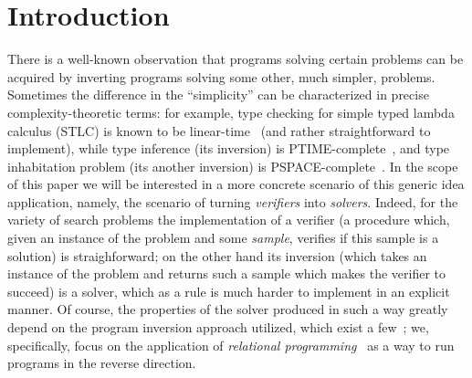 \section{Introduction}


There is a well-known observation\cite{relational_solvers_for_seach_problems,semantics_modifiers} that programs solving certain problems can
be acquired by inverting programs solving some other, much simpler, problems. Sometimes
the difference in the ``simplicity'' can be characterized in precise complexity-theoretic terms:
for example, type checking for simple typed lambda calculus (STLC) is known to be
linear-time~\cite{find_one} (and rather straightforward to implement), while type inference (its inversion)
is PTIME-complete~\cite{find_one}, and type inhabitation problem (its another inversion) is
PSPACE-complete~\cite{find_one}. In the scope of this paper we will be interested in a more
concrete scenario of this generic idea application, namely, the scenario of turning \emph{verifiers}
into \emph{solvers}. Indeed, for the variety of search problems the implementation of
a verifier (a procedure which, given an instance of the problem and some \emph{sample}, verifies if
this sample is a solution) is straighforward; on the other hand its inversion (which takes an
instance of the problem and returns such a sample which makes the verifier to succeed) is a
solver, which as a rule is much harder to implement in an explicit manner. Of course,
the properties of the solver produced in such a way greatly depend on the program inversion approach
utilized, which exist a few~\cite{URA,some_gluck_papers_on_invertible_computations}; we, specifically,
focus on the application of \emph{relational programming}~\cite{The_reasoned_schemer}
as a way to run programs in the reverse direction.

